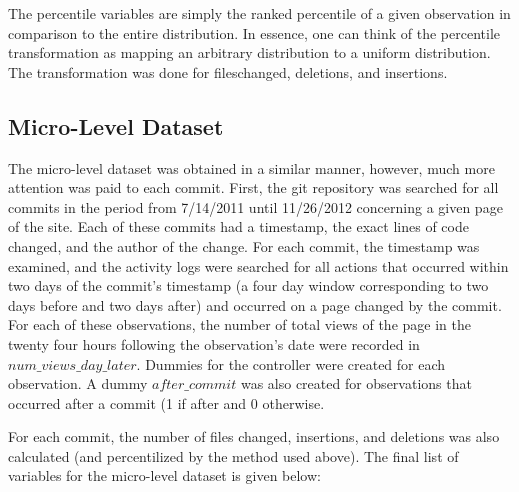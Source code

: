 \documentclass[12pt]{article}
\begin{document}
The percentile variables are simply the ranked percentile of a given observation in comparison to the entire distribution. In essence, one can think of the percentile transformation as mapping an arbitrary distribution to a uniform distribution. The transformation was done for fileschanged, deletions, and insertions.

\subsection{Micro-Level Dataset}

The micro-level dataset was obtained in a similar manner, however, much more attention was paid to each commit. First, the git repository was searched for all commits in the period from 7/14/2011 until 11/26/2012 concerning a given page of the site. Each of these commits had a timestamp, the exact lines of code changed, and the author of the change. For each commit, the timestamp was examined, and the activity logs were searched for all actions that occurred within two days of the commit's timestamp (a four day window corresponding to two days before and two days after) and occurred on a page changed by the commit. For each of these observations, the number of total views of the page in the twenty four hours following the observation's date were recorded in $num\_views\_day\_later$. Dummies for the controller were created for each observation. A dummy $after\_commit$ was also created for observations that occurred after a commit (1 if after and 0 otherwise. 

For each commit, the number of files changed, insertions, and deletions was also calculated (and percentilized by the method used above). The final list of variables for the micro-level dataset is given below:
\end{document}
